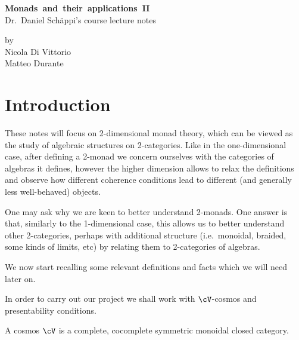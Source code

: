 \documentclass[a4paper,11pt,oneside,openany]{scrbook}
\begin{document}
\begin{titlepage}
	\begin{center}
		\Huge \textbf{Monads~and~their~applications~II}\\
		\vspace{1cm}
		\Large Dr.\ Daniel Schäppi's course lecture notes\\
	\end{center}

	\vspace{1cm}

	\begin{center}
		\Large	by\\
		\vspace{.2cm}
		\Large	Nicola Di Vittorio\\
		\Large	Matteo Durante\\

		
	\end{center}
\end{titlepage}
\thispagestyle{empty}\doclicenseThis

\frontmatter


\mainmatter

\chapter*{Introduction}

These notes will focus on 2-dimensional monad theory, which can be viewed as the
study of algebraic structures on 2-categories. Like in the one-dimensional case,
after defining a 2-monad we concern ourselves with the categories of algebras it
defines, however the higher dimension allows to relax the definitions and
observe how different coherence conditions lead to different (and generally less
well-behaved) objects.

One may ask why we are keen to better understand 2-monads. One answer is
that, similarly to the 1-dimensional case, this allows us to better understand
other 2-categories, perhaps with additional structure (i.e.\ monoidal, braided,
some kinds of limits, etc) by relating them to 2-categories of algebras.

We now start recalling some relevant definitions and facts which we will need
later on.

In order to carry out our project we shall work with $\cV$-cosmos and
presentability conditions.

\begin{defn}
    A cosmos $\cV$ is a complete, cocomplete symmetric monoidal closed category.
\end{defn}
\end{document}
